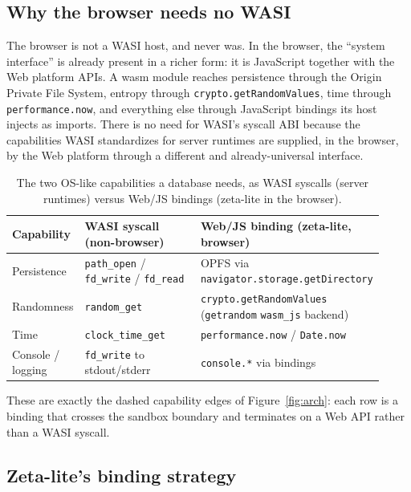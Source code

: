 \documentclass[11pt]{article}
\begin{document}
\subsection{Why the browser needs no WASI}

The browser is not a WASI host, and never was. In the browser, the ``system
interface'' is already present in a richer form: it is JavaScript together with the
Web platform APIs. A wasm module reaches persistence through the Origin Private File
System, entropy through \texttt{crypto.getRandomValues}, time through
\texttt{performance.now}, and everything else through JavaScript bindings its host
injects as imports. There is no need for WASI's syscall ABI because the capabilities
WASI standardizes for server runtimes are supplied, in the browser, by the Web
platform through a different and already-universal interface.

\begin{table}[htbp]
\centering
\caption{The two OS-like capabilities a database needs, as WASI syscalls (server
runtimes) versus Web/JS bindings (zeta-lite in the browser).}
\label{tab:wasi}
\small
\begin{tabular}{@{}p{0.16\linewidth}p{0.36\linewidth}p{0.40\linewidth}@{}}
\toprule
\textbf{Capability} & \textbf{WASI syscall (non-browser)} & \textbf{Web/JS binding (zeta-lite, browser)} \\
\midrule
Persistence & \texttt{path\_open} / \texttt{fd\_write} / \texttt{fd\_read} & OPFS via \texttt{navigator.storage.\allowbreak getDirectory} \\
Randomness & \texttt{random\_get} & \texttt{crypto.getRandomValues} (\texttt{getrandom} \texttt{wasm\_js} backend) \\
Time & \texttt{clock\_time\_get} & \texttt{performance.now} / \texttt{Date.now} \\
Console / logging & \texttt{fd\_write} to stdout/stderr & \texttt{console.*} via bindings \\
\bottomrule
\end{tabular}
\end{table}

These are exactly the dashed capability edges of Figure~\ref{fig:arch}: each row is
a binding that crosses the sandbox boundary and terminates on a Web API rather than
a WASI syscall.

\subsection{Zeta-lite's binding strategy}
\end{document}
